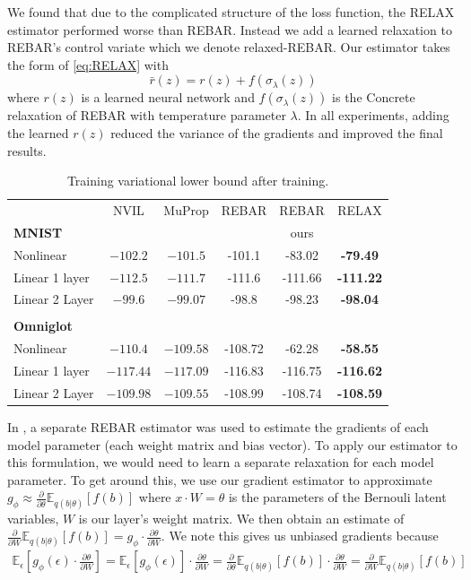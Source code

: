 \documentclass{article}
\newcommand{\relaxed}{r}
\newcommand{\E}{\mathbb{E}}
\newcommand{\PT}{\frac{\partial}{\partial \theta}}
\newcommand{\PP}[1]{\frac{\partial}{\partial #1}}
\begin{document}
We found that due to the complicated structure of the loss function, the RELAX estimator performed worse than REBAR. Instead we add a learned relaxation to REBAR's control variate which we denote relaxed-REBAR.
Our estimator takes the form of \eqref{eq:RELAX} with $$\bar \relaxed(z) = \relaxed(z) + f(\sigma_\lambda(z))$$ where $\relaxed(z)$ is a learned neural network and $f(\sigma_\lambda(z))$ is the Concrete relaxation of REBAR with temperature parameter $\lambda$.
In all experiments, adding the learned $\relaxed(z)$ reduced the variance of the gradients and improved the final results. 

\begin{table}[h]
\begin{center}
\begin{tabular}{l c c c c c} 
& NVIL & MuProp & REBAR & REBAR & RELAX \\
\textbf{MNIST} & & & \citet{tucker2017rebar} & ours & \\\midrule
Nonlinear      & $-102.2$ & $-101.5$ & -101.1  &  -83.02 &  \textbf{-79.49} \\
Linear 1 layer  & $-112.5$ & $-111.7$ & -111.6 & -111.66 & \textbf{-111.22} \\ 
Linear 2 Layer  & $-99.6$ & $-99.07$ & -98.8  & -98.23 & \textbf{-98.04} \\\\
\textbf{Omniglot}\\ \midrule
Nonlinear      & $-110.4$  & $-109.58$ & -108.72  & -62.28 & \textbf{-58.55} \\
Linear 1 layer & $-117.44$ & $-117.09$ & -116.83  & -116.75 & \textbf{-116.62} \\ 
Linear 2 Layer & $-109.98$ & $-109.55$ & -108.99  & -108.74 & \textbf{-108.59}
\end{tabular}
\end{center}
\label{tab:vae}
\caption{Training variational lower bound after training.}
\end{table}

In \citep{tucker2017rebar}, a separate REBAR estimator was used to estimate the gradients of each model parameter (each weight matrix and bias vector).
To apply our estimator to this formulation, we would need to learn a separate relaxation for each model parameter.
To get around this, we use our gradient estimator to approximate $g_\phi \approx \PT \E_{q(b|\theta)}[f(b)]$ where $x\cdot W = \theta$ is the parameters of the Bernouli latent variables, $W$ is our layer's weight matrix. We then obtain an estimate of $\PP{W} \E_{q(b|\theta)}[f(b)] = g_\phi\cdot \frac{\partial \theta}{\partial W}$. We note this gives us unbiased gradients because 
\begin{align}
\E_\epsilon[g_\phi(\epsilon) \cdot \frac{\partial \theta}{\partial W}] = \E_\epsilon[g_\phi(\epsilon)] \cdot \frac{\partial \theta}{\partial W} =  \PT \E_{q(b|\theta)}[f(b)] \cdot \frac{\partial \theta}{\partial W} = 
\frac{\partial}{\partial W} \E_{q(b|\theta)}[f(b)]
\end{align} 
\end{document}
